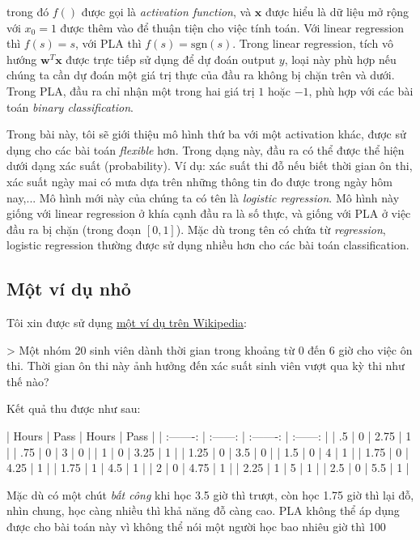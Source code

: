 trong đó $f()$ được gọi là \textit{activation function}, và $\mathbf{x}$ được hiểu là dữ liệu mở rộng với $x_0 = 1$ được thêm vào để thuận tiện cho việc tính toán. Với linear regression thì $f(s) = s$, với PLA thì $f(s) = \text{sgn}(s)$. Trong linear regression, tích vô hướng $\mathbf{w}^T\mathbf{x}$ được trực tiếp sử dụng để dự đoán output $y$, loại này phù hợp nếu chúng ta cần dự đoán một giá trị thực của đầu ra không bị chặn trên và dưới. Trong PLA, đầu ra chỉ nhận một trong hai giá trị $1$ hoặc $-1 $, phù hợp với các bài toán \textit{binary classification}.  
 
Trong bài này, tôi sẽ giới thiệu mô hình thứ ba với một activation khác, được sử dụng cho các bài toán \textit{flexible} hơn. Trong dạng này, đầu ra có thể được thể hiện dưới dạng xác suất (probability). Ví dụ: xác suất thi đỗ nếu biết thời gian ôn thi, xác suất ngày mai có mưa dựa trên những thông tin đo được trong ngày hôm nay,... Mô hình mới này của chúng ta có tên là \textit{logistic regression}. Mô hình này giống với linear regression ở khía cạnh đầu ra là số thực, và giống với PLA ở việc đầu ra bị chặn (trong đoạn $[0, 1]$). Mặc dù trong tên có chứa từ \textit{regression}, logistic regression thường được sử dụng nhiều hơn cho các bài toán classification. 
 
 
\subsection{Một ví dụ nhỏ }
Tôi xin được sử dụng \href{https://en.wikipedia.org/wiki/Logistic_regression}{một ví dụ trên Wikipedia}: 
 
> Một nhóm 20 sinh viên dành thời gian trong khoảng từ 0 đến 6 giờ cho việc ôn thi. Thời gian ôn thi này ảnh hưởng đến xác suất sinh viên vượt qua kỳ thi như thế nào? 
 
Kết quả thu được như sau: 
 
| Hours     | Pass     | Hours     | Pass     | 
| :-------: | :------: | :-------: | :------: | 
| .5        | 0        | 2.75      | 1        | 
| .75       | 0        | 3         | 0        | 
| 1         | 0        | 3.25      | 1        | 
| 1.25      | 0        | 3.5       | 0        | 
| 1.5       | 0        | 4         | 1        | 
| 1.75      | 0        | 4.25      | 1        | 
| 1.75      | 1        | 4.5       | 1        | 
| 2         | 0        | 4.75      | 1        | 
| 2.25      | 1        | 5         | 1        | 
| 2.5       | 0        | 5.5       | 1        | 
 
Mặc dù có một chút \textit{bất công} khi học 3.5 giờ thì trượt, còn học 1.75 giờ thì lại đỗ, nhìn chung, học càng nhiều thì khả năng đỗ càng cao. PLA không thể áp dụng được cho bài toán này vì không thể nói một người học bao nhiêu giờ thì 100%
 
